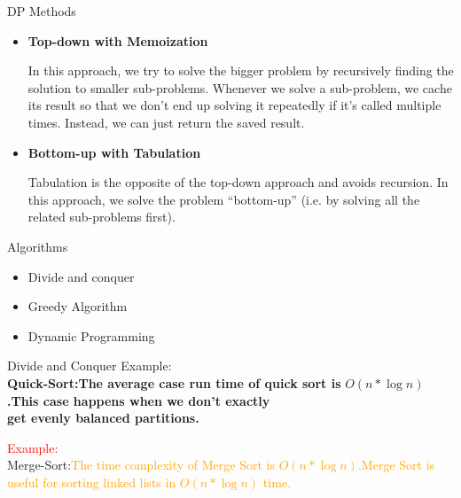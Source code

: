 \documentclass{beamer}[10pt]
\begin{document}
\begin{frame}{DP Methods}

\begin{itemize}
    \item \textbf{Top-down with Memoization}
    \begin{block}{1}
    In this approach, we try to solve the bigger problem by recursively finding the solution to smaller sub-problems. Whenever we solve a sub-problem, we cache its result so that we don’t end up solving it repeatedly if it’s called multiple times. Instead, we can just return the saved result.

    \end{block}
    
    \item <2-> \textbf{Bottom-up with Tabulation}
    \begin{alertblock}{2}
    Tabulation is the opposite of the top-down approach and avoids recursion. In this approach, we solve the problem “bottom-up” (i.e. by solving all the related sub-problems first).

    
    \end{alertblock}
\end{itemize}
    
\end{frame}

\begin{frame}{Algorithms}

\transdissolve

\label{Algorithms}
\begin{itemize}
    \item Divide and conquer \pause
    \invisible \item Greedy Algorithm \pause
    \invisible \item Dynamic Programming 
\end{itemize}
    
\end{frame}

\begin{frame}{Divide and Conquer}
{Example:\\
\textbf{Quick-Sort:The average case run time of quick sort is} $O(n*\log n)$\textbf{.This case happens when we don't exactly \\ get evenly balanced partitions.}}

{\textcolor{red}{Example:} \\
Merge-Sort:\textcolor{orange}{The time complexity of Merge Sort is $O(n*\log n)$.Merge Sort is useful for sorting linked lists in $O(n*\log n)$ time.}}
    
\end{frame}
\end{document}
